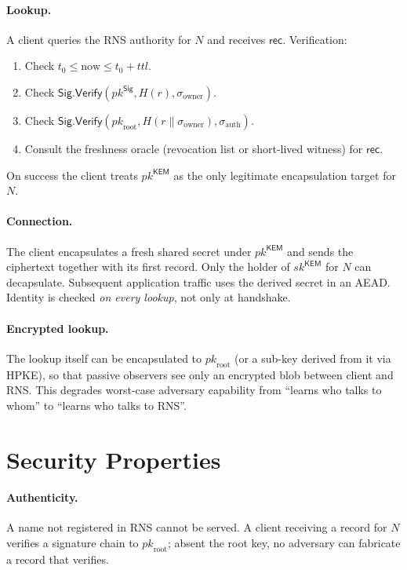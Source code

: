 \documentclass[11pt,a4paper]{article}
\theoremstyle{definition}
\theoremstyle{remark}
\newcommand{\rec}{\mathsf{rec}}
\newcommand{\KEM}{\mathsf{KEM}}
\newcommand{\Sig}{\mathsf{Sig}}
\newcommand{\Verify}{\mathsf{Verify}}
\newcommand{\pk}{\mathit{pk}}
\newcommand{\sk}{\mathit{sk}}
\begin{document}
\paragraph{Lookup.} A client queries the RNS authority for $N$ and
receives $\rec$. Verification:
\begin{enumerate}[leftmargin=*]
\item Check $t_0 \le \mathrm{now} \le t_0 + \mathit{ttl}$.
\item Check $\Sig.\Verify(\pk^\Sig, H(r), \sigma_{\mathrm{owner}})$.
\item Check $\Sig.\Verify(\pk_{\mathrm{root}}, H(r \| \sigma_{\mathrm{owner}}), \sigma_{\mathrm{auth}})$.
\item Consult the freshness oracle (revocation list or short-lived
witness) for $\rec$.
\end{enumerate}
On success the client treats $\pk^\KEM$ as the only legitimate
encapsulation target for $N$.

\paragraph{Connection.} The client encapsulates a fresh shared secret
under $\pk^\KEM$ and sends the ciphertext together with its first
record. Only the holder of $\sk^\KEM$ for $N$ can decapsulate.
Subsequent application traffic uses the derived secret in an AEAD.
Identity is checked \emph{on every lookup}, not only at handshake.

\paragraph{Encrypted lookup.} The lookup itself can be encapsulated
to $\pk_{\mathrm{root}}$ (or a sub-key derived from it via HPKE), so
that passive observers see only an encrypted blob between client and
RNS. This degrades worst-case adversary capability from ``learns who
talks to whom'' to ``learns who talks to RNS''.

\section{Security Properties}\label{sec:sec}

\paragraph{Authenticity.} A name not registered in RNS cannot be
served. A client receiving a record for $N$ verifies a signature chain
to $\pk_{\mathrm{root}}$; absent the root key, no adversary can
fabricate a record that verifies.
\end{document}
